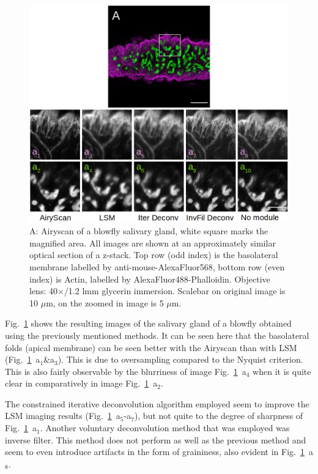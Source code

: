 \begin{figure}[h!]
\centering
\includegraphics[width=.9\columnwidth]{Exp_6_Airyscan/Figures/BlowSl}
\caption{A: Airyscan of a blowfly salivary gland, white square marks the magnified area. 
All images are shown at an approximately similar optical section of a z-stack. 
Top row (odd index) is the basolateral membrane labelled by anti-mouse-AlexaFluor568, bottom row (even index) is Actin, labelled by AlexaFluor488-Phalloidin. 
Objective lens: 40$\times$/1.2 lmm glycerin immersion. 
Scalebar on original image is 10 $\mu$m, on the zoomed in image is 5 $\mu$m.}
\label{fig:bloair}
\end{figure}

Fig.~\ref{fig:bloair} shows the resulting images of the salivary gland of a blowfly obtained using the previously mentioned methods. 
It can be seen here that the basolateral folds (apical membrane) can be seen better with the Airyscan than with LSM (Fig.~\ref{fig:bloair}~a$_{1}$\&a$_{3}$). 
This is due to oversampling compared to the Nyquist criterion. 
This is also fairly observable by the blurriness of image Fig.~\ref{fig:bloair}~a$_{4}$ when it is quite clear in comparatively in image Fig.~\ref{fig:bloair}~a$_{2}$. 

The constrained iterative deconvolution algorithm employed seem to improve the LSM imaging results (Fig.~\ref{fig:bloair}~a$_{5}$-a$_{7}$), but not quite to the degree of sharpness of Fig.~\ref{fig:bloair}~a$_{1}$. 
Another voluntary deconvolution method that was employed was inverse filter. 
This method does not perform as well as the previous method and seem to even introduce artifacts in the form of graininess, also evident in Fig.~\ref{fig:bloair}~a$_{8}$. 

